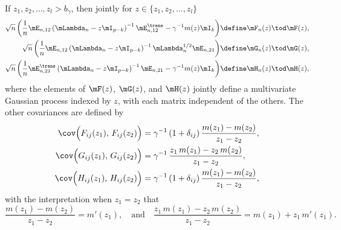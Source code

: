 \begin{lemma}\label{L:eij-product-scaled-limits}
    If $z_1, z_2, \ldots, z_l > b_\gamma$, 
    then jointly for $z \in \{ z_1, z_2, \ldots, z_l \}$
    \begin{subequations}
    \begin{align}
        \sqrt{n}
        \left(
            \frac{1}{n}
            \mE_{n,12}
            \left(
                \mLambda_n
                -
                z
                \mI_{p-k}
            \right)^{-1}
            \mE_{n,12}^\trans
            -
            \gamma^{-1}
            m(z)
            \mI_k
        \right) 
            &\define \mF_n(z)
            \tod \mF(z), \\
        \sqrt{n}
        \left(
            \frac{1}{n}
            \mE_{n,12}
            \left(
                \mLambda_n
                -
                z
                \mI_{p-k}
            \right)^{-1}
            \mLambda_{n}^{1/2}
            \mE_{n,21}
        \right) 
            &\define \mG_n(z)
            \tod \mG(z), \\
        \sqrt{n}
        \left(
            \frac{1}{n}
            \mE_{n,21}^\trans
            \left(
                \mLambda_n
                -
                z
                \mI_{p-k}
            \right)^{-1}
            \mE_{n,21}
            -
            \gamma^{-1}
            m(z)
            \mI_k
        \right) 
            &\define \mH_n(z)
            \tod \mH(z),
    \end{align}
    \end{subequations}
    where the elements of $\mF(z)$, $\mG(z)$, and $\mH(z)$
    jointly define a multivariate Gaussian process indexed by $z$,
    with each matrix independent of the others. 
    The other covariances are defined by
    \begin{subequations}
    \begin{align}
        \cov\Big( F_{ij}(z_1), \, F_{ij}(z_2) \Big)
            &= \gamma^{-1}
               \left( 1 + \delta_{ij} \right)
               \frac{ m(z_1) - m(z_2) }
                    { z_1 - z_2 }, \\
        \cov\Big( G_{ij}(z_1), \, G_{ij}(z_2) \Big)
            &= \gamma^{-1} \,
               \frac{ z_1 \, m(z_1) - z_2 \, m(z_2) }
                    { z_1 - z_2 }, \\
        \cov\Big( H_{ij}(z_1), \, H_{ij}(z_2) \Big)
            &= \gamma^{-1}
               \left( 1 + \delta_{ij} \right)
               \frac{ m(z_1) - m(z_2) }
                    { z_1 - z_2 },
    \end{align}
    \end{subequations}
    with the interpretation when $z_1 = z_2$ that
    \[
        \frac{ m(z_1) - m(z_2) }
             { z_1 - z_2 }
            =
                m'(z_1),
        \quad\text{and}\quad
        \frac{ z_1 \, m(z_1) - z_2 \, m(z_2) }
             { z_1 - z_2 }
            = m( z_1 ) + z_1 \, m'(z_1).
    \]
\end{lemma}
